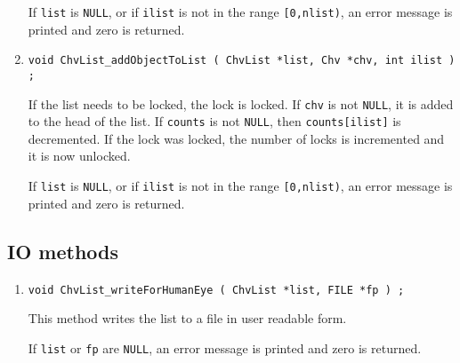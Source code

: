 \begin{enumerate}
If {\tt list} is {\tt NULL},
or if {\tt ilist} is not in the range {\tt [0,nlist)},
an error message is printed and zero is returned.
\item
\begin{verbatim}
void ChvList_addObjectToList ( ChvList *list, Chv *chv, int ilist ) ;
\end{verbatim}
\par
If the list needs to be locked, the lock is locked.
If {\tt chv} is not {\tt NULL}, it is added to the head of the list.
If {\tt counts} is not {\tt NULL}, then {\tt counts[ilist]} is
decremented.
If the lock was locked, the number of locks is incremented
and it is now unlocked.
\par {}
If {\tt list} is {\tt NULL},
or if {\tt ilist} is not in the range {\tt [0,nlist)},
an error message is printed and zero is returned.
\end{enumerate}
\par
\subsection{IO methods}
\label{subsection:ChvList:proto:IO}
\par
\begin{enumerate}
\item
\begin{verbatim}
void ChvList_writeForHumanEye ( ChvList *list, FILE *fp ) ;
\end{verbatim}
\par
This method writes the list to a file in user readable form.
\par {}
If {\tt list} or {\tt fp} are {\tt NULL},
an error message is printed and zero is returned.
\end{enumerate}
